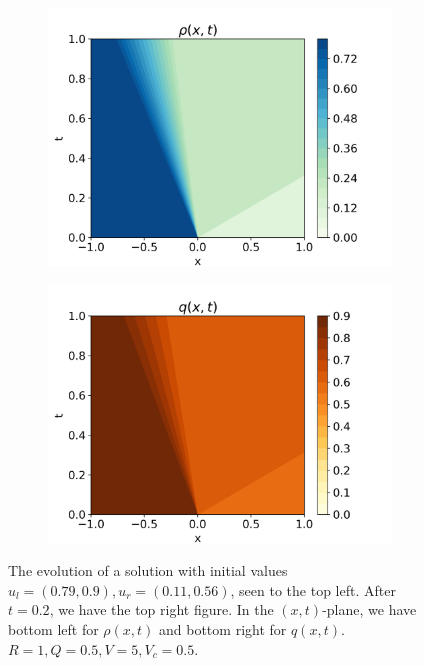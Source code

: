 \documentclass[10pt]{article}
\numberwithin{equation}{section}
\begin{document}
\begin{figure}[H]
\begin{subfigure}[b]{0.35\textwidth}
         \includegraphics[width=\textwidth]{Figures/Model/Sys1aRho.png}
     \end{subfigure}
     \begin{subfigure}[b]{0.35\textwidth}
         \centering
         \includegraphics[width=\textwidth]{Figures/Model/Sys1aQ.png}
     \end{subfigure}
        \caption{The evolution of a solution with initial values $u_l = (0.79, 0.9), u_r = (0.11, 0.56)$, seen to the top left. After $t = 0.2$, we have the top right figure. In the $(x,t)$-plane, we have bottom left for $\rho(x,t)$ and bottom right for $q(x,t)$. $R = 1, Q = 0.5, V = 5, V_c = 0.5$.}
        \label{fig:Example1a}
\end{figure} \begin{figure}[H]

\end{figure}
\end{document}

